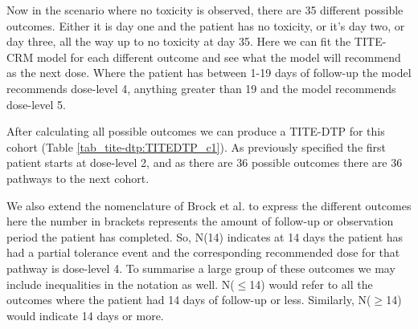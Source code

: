 Now in the scenario where no toxicity is observed, there are 35 different possible outcomes. Either it is day one and the patient has no toxicity, or it's day two, or day three, all the way up to no toxicity at day 35. Here we can fit the TITE-CRM model for each different outcome and see what the model will recommend as the next dose. Where the patient has between 1-19 days of follow-up the model recommends dose-level 4, anything greater than 19 and the model recommends dose-level 5.  

After calculating all possible outcomes we can produce a TITE-DTP for this cohort (Table \ref{tab_tite-dtp:TITEDTP_c1}). As previously specified the first patient starts at dose-level 2, and as there are 36 possible outcomes there are 36 pathways to the next cohort.

We also extend the nomenclature of Brock et al. \cite{brockImplementingEffToxDosefinding2017} to express the different outcomes here the number in brackets represents the amount of follow-up or observation period the patient has completed. So,  N(14) indicates at 14 days the patient has had a partial tolerance event and the corresponding recommended dose for that pathway is dose-level 4. To summarise a large group of these outcomes we may include inequalities in the notation as well. N($\leq$14) would refer to all the outcomes where the patient had 14 days of follow-up or less. Similarly, N($\geq$14) would indicate 14 days or more. 

